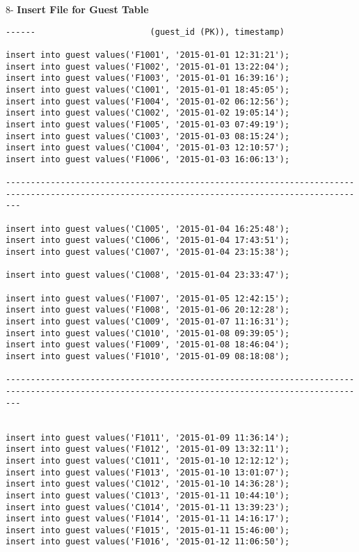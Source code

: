 \documentclass[a4,12pt]{report}
\begin{document}
\begin{flushleft}
8- \textbf{Insert File for Guest Table}
\end{flushleft}

\begin{lstlisting}
------                       (guest_id (PK)), timestamp)

insert into guest values('F1001', '2015-01-01 12:31:21');
insert into guest values('F1002', '2015-01-01 13:22:04');
insert into guest values('F1003', '2015-01-01 16:39:16');
insert into guest values('C1001', '2015-01-01 18:45:05');
insert into guest values('F1004', '2015-01-02 06:12:56');
insert into guest values('C1002', '2015-01-02 19:05:14');
insert into guest values('F1005', '2015-01-03 07:49:19');
insert into guest values('C1003', '2015-01-03 08:15:24');
insert into guest values('C1004', '2015-01-03 12:10:57');
insert into guest values('F1006', '2015-01-03 16:06:13');

-----------------------------------------------------------------------------------------------------------------------------------------------

insert into guest values('C1005', '2015-01-04 16:25:48');
insert into guest values('C1006', '2015-01-04 17:43:51');
insert into guest values('C1007', '2015-01-04 23:15:38');

insert into guest values('C1008', '2015-01-04 23:33:47');

insert into guest values('F1007', '2015-01-05 12:42:15');
insert into guest values('F1008', '2015-01-06 20:12:28');
insert into guest values('C1009', '2015-01-07 11:16:31');
insert into guest values('C1010', '2015-01-08 09:39:05');
insert into guest values('F1009', '2015-01-08 18:46:04');
insert into guest values('F1010', '2015-01-09 08:18:08');

-----------------------------------------------------------------------------------------------------------------------------------------------


insert into guest values('F1011', '2015-01-09 11:36:14');
insert into guest values('F1012', '2015-01-09 13:32:11');
insert into guest values('C1011', '2015-01-10 12:12:12');
insert into guest values('F1013', '2015-01-10 13:01:07');
insert into guest values('C1012', '2015-01-10 14:36:28');
insert into guest values('C1013', '2015-01-11 10:44:10');
insert into guest values('C1014', '2015-01-11 13:39:23');
insert into guest values('F1014', '2015-01-11 14:16:17');
insert into guest values('F1015', '2015-01-11 15:46:00');
insert into guest values('F1016', '2015-01-12 11:06:50');


\end{lstlisting}
\end{document}
